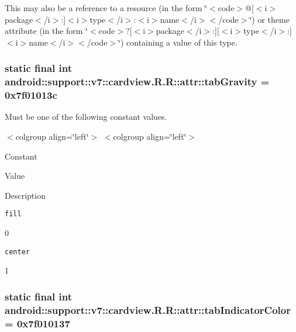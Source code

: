 This may also be a reference to a resource (in the form \char`\"{}$<$code$>$@\mbox{[}$<$i$>$package$<$/i$>$:\mbox{]}$<$i$>$type$<$/i$>$:$<$i$>$name$<$/i$>$$<$/code$>$\char`\"{}) or theme attribute (in the form \char`\"{}$<$code$>$?\mbox{[}$<$i$>$package$<$/i$>$:\mbox{]}\mbox{[}$<$i$>$type$<$/i$>$:\mbox{]}$<$i$>$name$<$/i$>$$<$/code$>$\char`\"{}) containing a value of this type. \hypertarget{classandroid_1_1support_1_1v7_1_1cardview_1_1_r_1_1attr_0bfb5aebe448f018a8a2863a238483c3}{
\subsubsection[{tabGravity}]{\setlength{\rightskip}{0pt plus 5cm}static final int android::support::v7::cardview.R.R::attr::tabGravity = 0x7f01013c}}
\label{classandroid_1_1support_1_1v7_1_1cardview_1_1_r_1_1attr_0bfb5aebe448f018a8a2863a238483c3}


Must be one of the following constant values. \begin{TabularC}{0}
\hline
\end{TabularC}
$<$colgroup align=\char`\"{}left\char`\"{}$>$ $<$colgroup align=\char`\"{}left\char`\"{}$>$ 

Constant

Value

Description 

{\tt fill}

0

{\tt center}

1\hypertarget{classandroid_1_1support_1_1v7_1_1cardview_1_1_r_1_1attr_35a0473a75a5763d28c42841719b068c}{
\subsubsection[{tabIndicatorColor}]{\setlength{\rightskip}{0pt plus 5cm}static final int android::support::v7::cardview.R.R::attr::tabIndicatorColor = 0x7f010137}}
\label{classandroid_1_1support_1_1v7_1_1cardview_1_1_r_1_1attr_35a0473a75a5763d28c42841719b068c}



